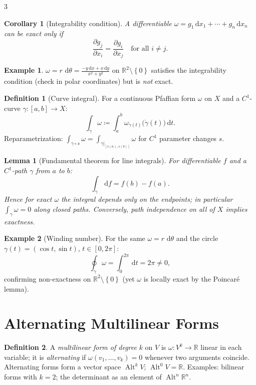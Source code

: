 \documentclass[10pt,a4paper,landscape]{article}
\theoremstyle{definition}
\newtheorem{defn}{Definition}[section]
\newtheorem{exm}{Example}[section]
\theoremstyle{plain}
\newtheorem{lem}{Lemma}[section]
\newtheorem{cor}{Corollary}[section]
\theoremstyle{remark}
\newcommand{\R}{\mathbb{R}}
\newcommand{\dd}{\,\mathrm{d}}
\newcommand{\set}[1]{\left\{ #1 \right\}}
\newcommand{\deq}{\coloneqq}
\newcommand{\comp}{\circ}
\DeclareMathOperator{\Alt}{Alt}
\begin{document}
\begin{multicols*}{3}
\begin{cor}[Integrability condition]
A differentiable $\omega = g_1 \dd x_1 + \cdots + g_n \dd x_n$ can be exact only if
\[
\frac{\partial g_j}{\partial x_i} = \frac{\partial g_i}{\partial x_j} \quad \text{for all } i \neq j .
\]
\end{cor}

\begin{exm}
$\omega = r\,\dd\theta = \frac{-y \dd x + x \dd y}{x^2+y^2}$ on $\R^2 \setminus \set{0}$ satisfies the integrability condition (check in polar coordinates) but is \emph{not} exact.
\end{exm}

\begin{defn}[Curve integral]
For a continuous Pfaffian form $\omega$ on $X$ and a $C^1$-curve $\gamma: [a,b] \to X$:
\[
\int_\gamma \omega \deq \int_a^b \omega_{\gamma(t)}\bigl(\dot\gamma(t)\bigr) \dd t .
\]
Reparametrization: $\int_{\gamma \comp s} \omega = \int_{\gamma|_{[s(a),s(b)]}} \omega$ for $C^1$ parameter changes $s$.
\end{defn}

\begin{lem}[Fundamental theorem for line integrals]
For differentiable $f$ and a $C^1$-path $\gamma$ from $a$ to $b$:
\[
\int_\gamma \dd f = f(b) - f(a).
\]
Hence for exact $\omega$ the integral depends only on the endpoints; in particular $\int_\gamma \omega = 0$ along closed paths. Conversely, path independence on all of $X$ implies exactness.
\end{lem}

\begin{exm}[Winding number]
For the same $\omega = r\,\dd\theta$ and the circle $\gamma(t) = (\cos t, \sin t)$, $t \in [0, 2\pi]$:
\[
\oint_\gamma \omega = \int_0^{2\pi} \dd t = 2\pi \neq 0 ,
\]
confirming non-exactness on $\R^2 \setminus \set{0}$ (yet $\omega$ is locally exact by the Poincar\'e lemma).
\end{exm}

\section{Alternating Multilinear Forms}

\begin{defn}
A \emph{multilinear form of degree} $k$ on $V$ is $\omega: V^k \to \R$ linear in each variable; it is \emph{alternating} if $\omega(v_1, \dots, v_k) = 0$ whenever two arguments coincide. Alternating forms form a vector space $\Alt^k V$; $\Alt^0 V = \R$. Examples: bilinear forms with $k = 2$; the determinant as an element of $\Alt^n \R^n$.
\end{defn}


\end{multicols*}
\end{document}
